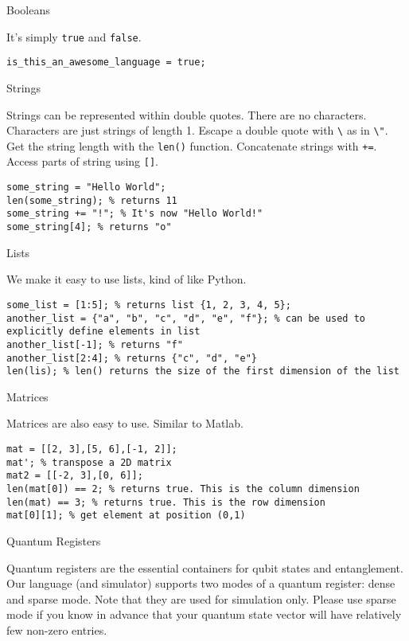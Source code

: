 \documentclass[]{article}
\begin{document}
Booleans

It's simply \texttt{true} and \texttt{false}.

\begin{verbatim}
is_this_an_awesome_language = true;
\end{verbatim}

Strings

Strings can be represented within double quotes. There are no
characters. Characters are just strings of length 1. Escape a double
quote with \texttt{\textbackslash{}} as in \texttt{\textbackslash{}"}.
Get the string length with the \texttt{len()} function. Concatenate
strings with \texttt{+=}. Access parts of string using \texttt{{[}{]}}.

\begin{verbatim}
some_string = "Hello World";
len(some_string); % returns 11
some_string += "!"; % It's now "Hello World!"
some_string[4]; % returns "o"
\end{verbatim}

Lists

We make it easy to use lists, kind of like Python.

\begin{verbatim}
some_list = [1:5]; % returns list {1, 2, 3, 4, 5};
another_list = {"a", "b", "c", "d", "e", "f"}; % can be used to explicitly define elements in list
another_list[-1]; % returns "f"
another_list[2:4]; % returns {"c", "d", "e"}
len(lis); % len() returns the size of the first dimension of the list
\end{verbatim}

Matrices

Matrices are also easy to use. Similar to Matlab.

\begin{verbatim}
mat = [[2, 3],[5, 6],[-1, 2]];
mat'; % transpose a 2D matrix
mat2 = [[-2, 3],[0, 6]];
len(mat[0]) == 2; % returns true. This is the column dimension
len(mat) == 3; % returns true. This is the row dimension
mat[0][1]; % get element at position (0,1)
\end{verbatim}

Quantum Registers

Quantum registers are the essential containers for qubit states and
entanglement. Our language (and simulator) supports two modes of a
quantum register: dense and sparse mode. Note that they are used for
simulation only. Please use sparse mode if you know in advance that your
quantum state vector will have relatively few non-zero entries.
\end{document}
